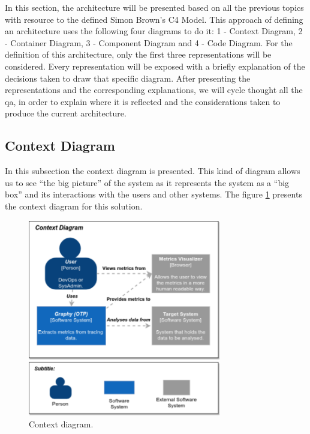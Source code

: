 In this section, the architecture will be presented based on all the previous topics with resource to the defined Simon Brown’s C4 Model\cite{simon_browns_c4_model}. This approach of defining an architecture uses the following four diagrams to do it: 1 - Context Diagram, 2 - Container Diagram, 3 - Component Diagram and 4 - Code Diagram. For the definition of this architecture, only the first three representations will be considered. Every representation will be exposed with a briefly explanation of the decisions taken to draw that specific diagram. After presenting the representations and the corresponding explanations, we will cycle thought all the \gls{qa}, in order to explain where it is reflected and the considerations taken to produce the current architecture.


\subsection{Context Diagram}
\label{subsec:context_diagram}

In this subsection the context diagram is presented. This kind of diagram allows us to see ``the big picture'' of the system as it represents the system as a ``big box'' and its interactions with the users and other systems. The figure \ref{fig:context_diagram} presents the context diagram for this solution.

\begin{figure}[!ht]
    \centering
    \includegraphics[width=0.75\textwidth]{images/context_diagram.pdf}
    \caption{Context diagram.}
    \label{fig:context_diagram}
\end{figure}

